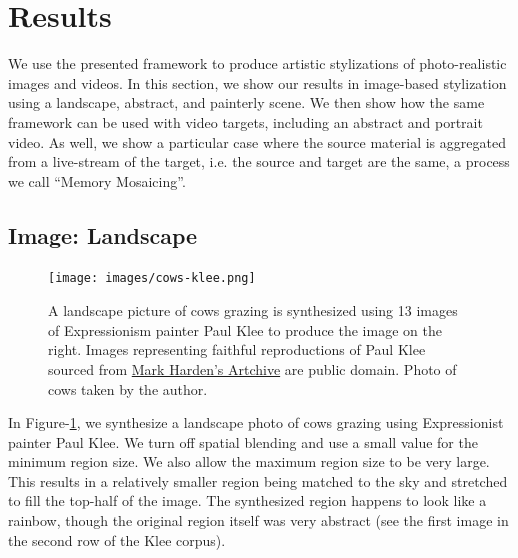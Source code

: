 \documentclass[a4paper,10pt,final]{ThesisStyle}
\begin{document}
\section{Results}  
\label{sec:results}
We use the presented framework to produce artistic stylizations of photo-realistic images and videos.  In this section, we show our results in image-based stylization using a landscape, abstract, and painterly scene. We then show how the same framework can be used with video targets, including an abstract and portrait video.  As well, we show a particular case where the source material is aggregated from a live-stream of the target, i.e. the source and target are the same, a process we call ``Memory Mosaicing''.  

\subsection{Image: Landscape}\vspace{-0.4em}
\begin{figure}[ht]
  \centering
  \texttt{[image: images/cows-klee.png]}
  \caption{A landscape picture of cows grazing is synthesized using 13 images of Expressionism painter Paul Klee to produce the image on the right.  Images representing faithful reproductions of Paul Klee sourced from \href{http://www.artchive.com/}{Mark Harden's Artchive} are public domain. Photo of cows taken by the author.}
  \label{fig:cows-klee}
\end{figure}
In Figure-\ref{fig:cows-klee}, we synthesize a landscape photo of cows grazing using Expressionist painter Paul Klee.  We turn off spatial blending and use a small value for the minimum region size.  We also allow the maximum region size to be very large.  This results in a relatively smaller region being matched to the sky and stretched to fill the top-half of the image.  The synthesized region happens to look like a rainbow, though the original region itself was very abstract (see the first image in the second row of the Klee corpus).  
\end{document}
